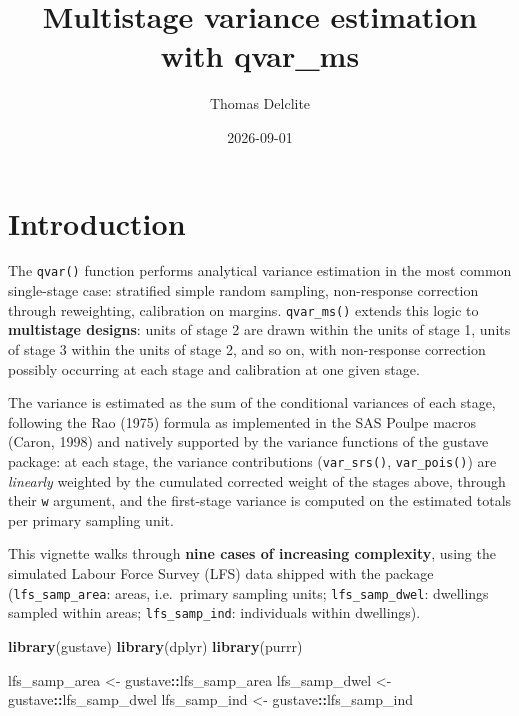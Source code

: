 \documentclass[
]{article}
\title{Multistage variance estimation with qvar\_ms}
\author{Thomas Delclite}
\date{2026-09-01}
\newenvironment{Shaded}{\begin{snugshade}}{\end{snugshade}}
\newcommand{\FunctionTok}[1]{\textcolor[rgb]{0.13,0.29,0.53}{\textbf{#1}}}
\newcommand{\NormalTok}[1]{#1}
\newcommand{\OtherTok}[1]{\textcolor[rgb]{0.56,0.35,0.01}{#1}}
\newcommand{\SpecialCharTok}[1]{\textcolor[rgb]{0.81,0.36,0.00}{\textbf{#1}}}
\begin{document}
\maketitle

{
\setcounter{tocdepth}{2}
\tableofcontents
}
\section{Introduction}\label{introduction}

The \texttt{qvar()} function performs analytical variance estimation in
the most common single-stage case: stratified simple random sampling,
non-response correction through reweighting, calibration on margins.
\texttt{qvar\_ms()} extends this logic to \textbf{multistage designs}:
units of stage 2 are drawn within the units of stage 1, units of stage 3
within the units of stage 2, and so on, with non-response correction
possibly occurring at each stage and calibration at one given stage.

The variance is estimated as the sum of the conditional variances of
each stage, following the Rao (1975) formula as implemented in the SAS
Poulpe macros (Caron, 1998) and natively supported by the variance
functions of the gustave package: at each stage, the variance
contributions (\texttt{var\_srs()}, \texttt{var\_pois()}) are
\emph{linearly} weighted by the cumulated corrected weight of the stages
above, through their \texttt{w} argument, and the first-stage variance
is computed on the estimated totals per primary sampling unit.

This vignette walks through \textbf{nine cases of increasing
complexity}, using the simulated Labour Force Survey (LFS) data shipped
with the package (\texttt{lfs\_samp\_area}: areas, i.e.~primary sampling
units; \texttt{lfs\_samp\_dwel}: dwellings sampled within areas;
\texttt{lfs\_samp\_ind}: individuals within dwellings).

\begin{Shaded}
\begin{Highlighting}[]
\FunctionTok{library}\NormalTok{(gustave)}
\FunctionTok{library}\NormalTok{(dplyr)}
\FunctionTok{library}\NormalTok{(purrr)}

\NormalTok{lfs\_samp\_area }\OtherTok{\textless{}{-}}\NormalTok{ gustave}\SpecialCharTok{::}\NormalTok{lfs\_samp\_area}
\NormalTok{lfs\_samp\_dwel }\OtherTok{\textless{}{-}}\NormalTok{ gustave}\SpecialCharTok{::}\NormalTok{lfs\_samp\_dwel}
\NormalTok{lfs\_samp\_ind  }\OtherTok{\textless{}{-}}\NormalTok{ gustave}\SpecialCharTok{::}\NormalTok{lfs\_samp\_ind}
\end{Highlighting}
\end{Shaded}
\end{document}
